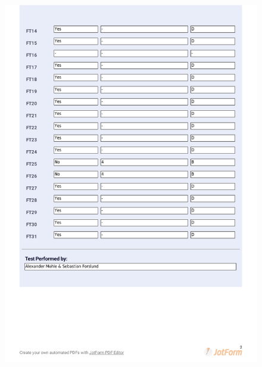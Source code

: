 \documentclass{article}
\begin{document}
 \begin{figure}
     \centering
     \includegraphics[width=13cm]{images/2021-03-04_Alexander_ST1-2}
     \renewcommand\figurename{Figure}
     \label{fig:my_label}
 \end{figure}
\end{document}
